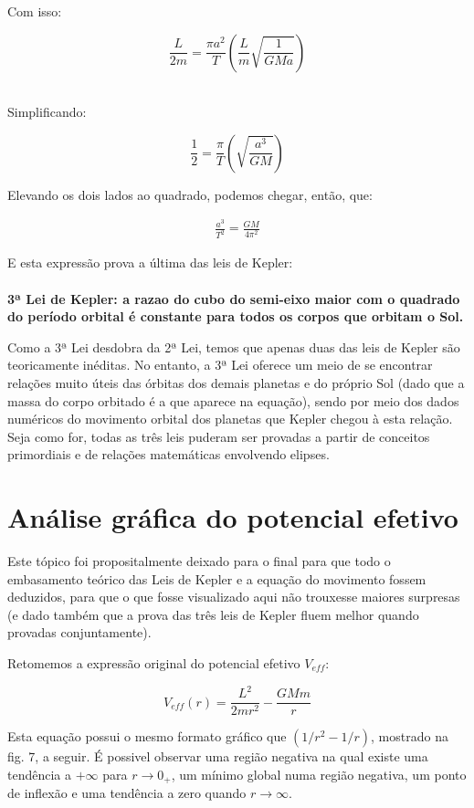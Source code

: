 Com isso:

\[
	\frac{L}{2m} = \frac{\pi a^2}{T}\left(\frac{L}{m}\sqrt{\frac{1}{GMa}}\right)
\]{\\}

Simplificando:

\[
	\frac{1}{2} = \frac{\pi}{T}\left(\sqrt{\frac{a^3}{GM}}\right)
\]

Elevando os dois lados ao quadrado, podemos chegar, então, que:

\begin{eqnarray}
	\frac{a^3}{T^2} = \frac{GM}{4\pi^2} \label{eq57}
\end{eqnarray}

E esta expressão prova a última das leis de Kepler:{\\}{\\}
\textbf{\Large{3ª Lei de Kepler: a razao do cubo do semi-eixo maior com o quadrado do período orbital é constante para todos os corpos que orbitam o Sol.}} {\\}

Como a 3ª Lei desdobra da 2ª Lei, temos que apenas duas das leis de Kepler são teoricamente inéditas. No entanto, a 3ª Lei oferece um meio de se encontrar relações muito úteis das órbitas dos demais planetas e do próprio Sol (dado que a massa do corpo orbitado é a que aparece na equação), sendo por meio dos dados numéricos do movimento orbital dos planetas que Kepler chegou à esta relação. Seja como for, todas as três leis puderam ser provadas a partir de conceitos primordiais e de relações matemáticas envolvendo elipses.

\section{Análise gráfica do potencial efetivo}

Este tópico foi propositalmente deixado para o final para que todo o embasamento teórico das Leis de Kepler e a equação do movimento fossem deduzidos, para que o que fosse visualizado aqui não trouxesse maiores surpresas (e dado também que a prova das três leis de Kepler fluem melhor quando provadas conjuntamente).{\\}

Retomemos a expressão original do potencial efetivo $V_{eff}$:

\[
	V_{eff}(r) = \frac{L^2}{2mr^2} - \frac{GMm}{r} 
\]

Esta equação possui o mesmo formato gráfico que $(1/r^2 - 1/r)$, mostrado na fig. 7, a seguir. É possivel observar uma região negativa na qual existe uma tendência a $+\infty$ para $r \rightarrow 0_+$, um mínimo global numa região negativa, um ponto de inflexão e uma tendência a zero quando $r \rightarrow \infty$.

